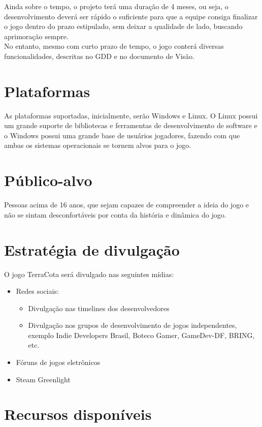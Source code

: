 \documentclass[12pt]{article}
\begin{document}
Ainda sobre o tempo, o projeto terá uma duração de 4 meses, ou seja, o desenvolvimento deverá
ser rápido o suficiente para que a equipe consiga finalizar o jogo dentro do prazo estipulado, sem
deixar a qualidade de lado, buscando aprimoração sempre. \\

No entanto, mesmo com curto prazo de tempo, o jogo conterá diversas funcionalidades, descritas no GDD e no documento de Visão.
\section{Plataformas}

As plataformas suportadas, inicialmente, serão Windows e Linux.
O Linux possui um grande suporte de bibliotecas e ferramentas de desenvolvimento de software e o Windows possui uma grande base de usuários jogadores, fazendo com que ambas os sistemas operacionais se tornem alvos para o jogo.


\section{Público-alvo}
Pessoas acima de 16 anos, que sejam capazes de compreender a ideia do jogo e não se sintam
desconfortáveis por conta da história e dinâmica do jogo.

\section{Estratégia de divulgação}

O jogo TerraCota será divulgado nas seguintes mídias:
\begin{itemize}
  \item Redes sociais:
  \begin{itemize}
    \item Divulgação nas timelines dos desenvolvedores
    \item Divulgação nos grupos de desenvolvimento de jogos independentes, exemplo Indie Developers Brasil, Boteco Gamer, GameDev-DF, BRING, etc.
  \end{itemize}
  \item Fóruns de jogos eletrônicos
  \item Steam Greenlight
\end{itemize}

\section{Recursos disponíveis}
\end{document}
